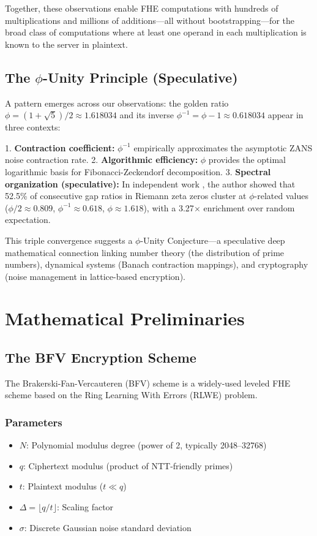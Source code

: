 \documentclass[11pt]{article}
\begin{document}
Together, these observations enable FHE computations with hundreds of multiplications and millions of additions—all without bootstrapping—for the broad class of computations where at least one operand in each multiplication is known to the server in plaintext.

\subsection{The $\phi$-Unity Principle (Speculative)}

A pattern emerges across our observations: the golden ratio $\phi = (1+\sqrt{5})/2 \approx 1.618034$ and its inverse $\phi^{-1} = \phi - 1 \approx 0.618034$ appear in three contexts:

1. \textbf{Contraction coefficient:} $\phi^{-1}$ empirically approximates the asymptotic ZANS noise contraction rate.
2. \textbf{Algorithmic efficiency:} $\phi$ provides the optimal logarithmic basis for Fibonacci-Zeckendorf decomposition.
3. \textbf{Spectral organization (speculative):} In independent work \cite{fernandez2026phi}, the author showed that 52.5\% of consecutive gap ratios in Riemann zeta zeros cluster at $\phi$-related values ($\phi/2 \approx 0.809$, $\phi^{-1} \approx 0.618$, $\phi \approx 1.618$), with a 3.27$\times$ enrichment over random expectation.

This triple convergence suggests a $\phi$-Unity Conjecture—a speculative deep mathematical connection linking number theory (the distribution of prime numbers), dynamical systems (Banach contraction mappings), and cryptography (noise management in lattice-based encryption).

\section{Mathematical Preliminaries}

\subsection{The BFV Encryption Scheme}

The Brakerski-Fan-Vercauteren (BFV) scheme \cite{brakerski2011efficient} is a widely-used leveled FHE scheme based on the Ring Learning With Errors (RLWE) problem.

\subsubsection{Parameters}
\begin{itemize}
    \item $N$: Polynomial modulus degree (power of 2, typically 2048--32768)
    \item $q$: Ciphertext modulus (product of NTT-friendly primes)
    \item $t$: Plaintext modulus ($t \ll q$)
    \item $\Delta = \lfloor q/t \rfloor$: Scaling factor
    \item $\sigma$: Discrete Gaussian noise standard deviation
\end{itemize}
\end{document}
